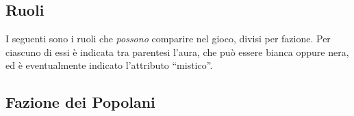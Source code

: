 \documentclass[a4paper,10pt]{article}
\begin{document}
\subsection{Ruoli}
\label{ruoli}


I seguenti sono i ruoli che \emph{possono} comparire nel gioco, divisi per fazione. Per ciascuno di essi è indicata tra parentesi l'aura, che può essere bianca oppure nera, ed è eventualmente indicato l'attributo ``mistico''.

\subsection*{Fazione dei Popolani}
\end{document}
